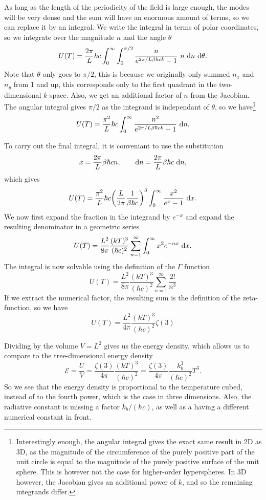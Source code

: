 \documentclass[a4paper, 11pt, notitlepage, english]{article}
\renewcommand{\d}{{\rm d}}
\begin{document}
As long as the length of the periodicity of the field is large enough, the modes will be very dense and the sum will have an enormous amount of terms, so we can replace it by an integral. We write the integral in terms of polar coordinates, so we integrate over the magnitude $n$ and the angle $\theta$
$$U(T) = \frac{2\pi}{L} \hbar c \int_0^\infty \int_0^{\pi/2} \frac{n}{e^{2\pi/L\beta \hbar  c k} - 1} \ n \ \d n\  \d \theta.$$
Note that $\theta$ only goes to $\pi/2$, this is because we originally only summed $n_x$ and $n_y$ from 1 and up, this corresponds only to the first quadrant in the two-dimensional $k$-space. Also, we get an additional factor of $n$ from the Jacobian. The angular integral gives $\pi/2$ as the integrand is independant of $\theta$, so we have\footnote{Interestingly enough, the angular integral gives the exact same result in 2D as 3D, as the magnitude of the circumference of the purely positive part of the unit circle is equal to the magnitude of the purely positive surface of the unit sphere. This is however not  the case for higher-order hyperspheres. In 3D however, the Jacobian gives an additional power of $k$, and so the remaining integrands differ.}
$$U(T) = \frac{\pi^2}{L} \hbar c \int_0^\infty \frac{n^2}{e^{2\pi/L\beta \hbar  c k} - 1} \ \d n.$$

\clearpage

To carry out the final integral, it is conveniant to use the substitution
$$x = \frac{2\pi}{L}\beta\hbar c n, \qquad \d n = \frac{2\pi}{L}\beta\hbar c \ \d n,$$
which gives
$$U(T) = \frac{\pi^2}{L} \hbar c \bigg(\frac{L}{2\pi}\frac{1}{\beta \hbar c}\bigg)^3 \int_0^\infty \frac{x^2}{e^{x} - 1} \ \d x. $$
We now first expand the fraction in the integrand by $e^{-x}$ and expand the resulting denominator in a geometric series
$$U(T) = \frac{L^2}{8\pi} \frac{(kT)^3}{(\hbar c)^2} \sum_{n=1}^\infty \int_0^\infty x^2 e^{-nx} \ \d x. $$
The integral is now solvable using the definition of the $\Gamma$ function
$$U(T) = \frac{L^2}{8\pi} \frac{(kT)^3}{(\hbar c)^2} \sum_{n=1}^\infty \frac{2!}{n^{3}}$$
If we extract the numerical factor, the resulting sum is the definition of the zeta-function, so we have
$$U(T) = \frac{L^2}{4\pi} \frac{(kT)^3}{(\hbar c)^2} \zeta(3)$$

Dividing by the volume $V=L^2$ gives us the energy density, which allows us to compare to the tree-dimensional energy density
$$\mathcal{E} = \frac{U}{V} = \frac{\zeta(3)}{4\pi} \frac{(kT)^3}{(\hbar c)^2} = \frac{\zeta(3)}{4\pi}\frac{k_b^3}{(\hbar c)^2} T^3.$$
So we see that the energy density is proportional to the temperature cubed, instead of to the fourth power, which is the case in three dimensions. Also, the radiative constant is missing a factor $k_b/(\hbar c)$, as well as a having a different numerical constant in front.
\end{document}
